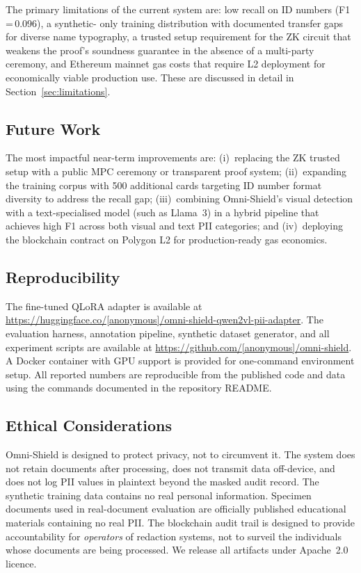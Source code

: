 The primary limitations of the current system are:
low recall on ID numbers (F1\,=\,0.096), a synthetic-
only training distribution with documented transfer
gaps for diverse name typography, a trusted setup
requirement for the ZK circuit that weakens the
proof's soundness guarantee in the absence of a
multi-party ceremony, and Ethereum mainnet gas costs
that require L2 deployment for economically viable
production use.
These are discussed in detail in
Section~\ref{sec:limitations}.

\subsection*{Future Work}

The most impactful near-term improvements are:
(i)~replacing the ZK trusted setup with a
public MPC ceremony or transparent proof system;
(ii)~expanding the training corpus with 500
additional cards targeting ID number format diversity
to address the recall gap;
(iii)~combining Omni-Shield's visual detection with
a text-specialised model (such as Llama~3) in a
hybrid pipeline that achieves high F1 across both
visual and text PII categories;
and (iv)~deploying the blockchain contract on
Polygon L2 for production-ready gas economics.

\subsection*{Reproducibility}

The fine-tuned QLoRA adapter is available at
\url{https://huggingface.co/[anonymous]/omni-shield-qwen2vl-pii-adapter}.
The evaluation harness, annotation pipeline,
synthetic dataset generator, and all experiment
scripts are available at
\url{https://github.com/[anonymous]/omni-shield}.
A Docker container with GPU support is provided
for one-command environment setup.
All reported numbers are reproducible from the
published code and data using the commands documented
in the repository README.

\subsection*{Ethical Considerations}

Omni-Shield is designed to protect privacy, not
to circumvent it.
The system does not retain documents after
processing, does not transmit data off-device,
and does not log PII values in plaintext beyond
the masked audit record.
The synthetic training data contains no real
personal information.
Specimen documents used in real-document evaluation
are officially published educational materials
containing no real PII.
The blockchain audit trail is designed to provide
accountability for \emph{operators} of redaction
systems, not to surveil the individuals whose
documents are being processed.
We release all artifacts under Apache~2.0 licence.
